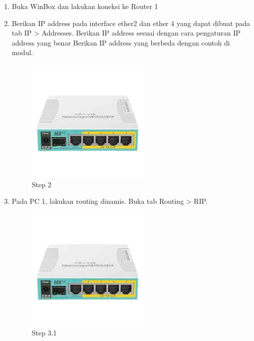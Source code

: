 \begin{enumerate}
	\item Buka WinBox dan lakukan koneksi ke Router 1

	\item Berikan IP address pada interface ether2 dan ether 4 yang dapat dibuat pada tab IP > Addresses. Berikan IP address sesuai dengan cara pengaturan IP address yang benar Berikan IP
	address yang berbeda dengan contoh di modul.
	\begin{figure}[H]
		\centering
		\includegraphics[width=0.5\linewidth]{P1/img/contoh.png}
		\caption{Step 2}
		\label{fig:gambar11}
	\end{figure}

	\item Pada PC 1, lakukan routing dinamis. Buka tab Routing > RIP.
	\begin{figure}[H]
		\centering
		\includegraphics[width=0.5\linewidth]{P1/img/contoh.png}
		\caption{Step 3.1}
		\label{fig:gambar38}
	\end{figure}


\end{enumerate}
